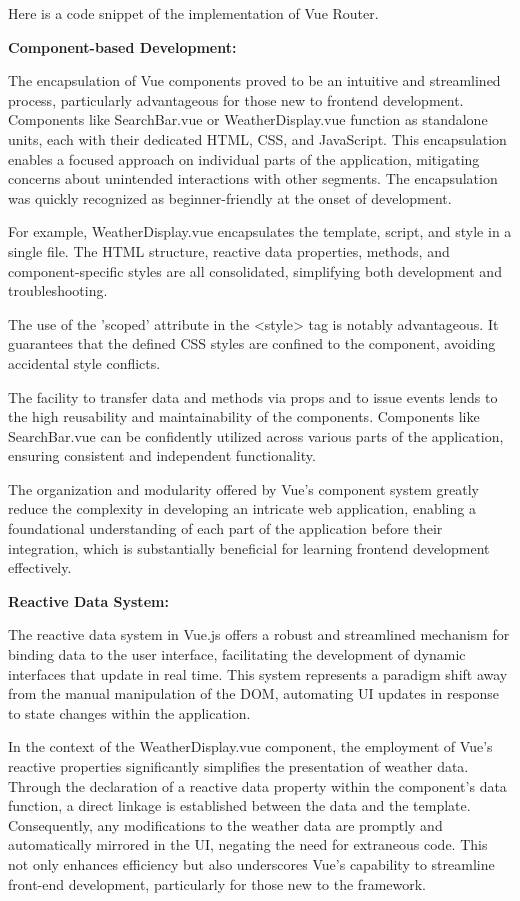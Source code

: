 Here is a code snippet of the implementation of Vue Router.



\textbf{Component-based Development:}

The encapsulation of Vue components proved to be an intuitive and streamlined process, particularly advantageous for those new to frontend development. Components like SearchBar.vue or WeatherDisplay.vue function as standalone units, each with their dedicated HTML, CSS, and JavaScript. This encapsulation enables a focused approach on individual parts of the application, mitigating concerns about unintended interactions with other segments. The encapsulation was quickly recognized as beginner-friendly at the onset of development.

For example, WeatherDisplay.vue encapsulates the template, script, and style in a single file. The HTML structure, reactive data properties, methods, and component-specific styles are all consolidated, simplifying both development and troubleshooting.

The use of the 'scoped' attribute in the <style> tag is notably advantageous. It guarantees that the defined CSS styles are confined to the component, avoiding accidental style conflicts.

The facility to transfer data and methods via props and to issue events lends to the high reusability and maintainability of the components. Components like SearchBar.vue can be confidently utilized across various parts of the application, ensuring consistent and independent functionality.

The organization and modularity offered by Vue’s component system greatly reduce the complexity in developing an intricate web application, enabling a foundational understanding of each part of the application before their integration, which is substantially beneficial for learning frontend development effectively.

\textbf{Reactive Data System:}

The reactive data system in Vue.js offers a robust and streamlined mechanism for binding data to the user interface, facilitating the development of dynamic interfaces that update in real time. This system represents a paradigm shift away from the manual manipulation of the DOM, automating UI updates in response to state changes within the application.

In the context of the WeatherDisplay.vue component, the employment of Vue's reactive properties significantly simplifies the presentation of weather data. Through the declaration of a reactive data property within the component's data function, a direct linkage is established between the data and the template. Consequently, any modifications to the weather data are promptly and automatically mirrored in the UI, negating the need for extraneous code. This not only enhances efficiency but also underscores Vue's capability to streamline front-end development, particularly for those new to the framework.

